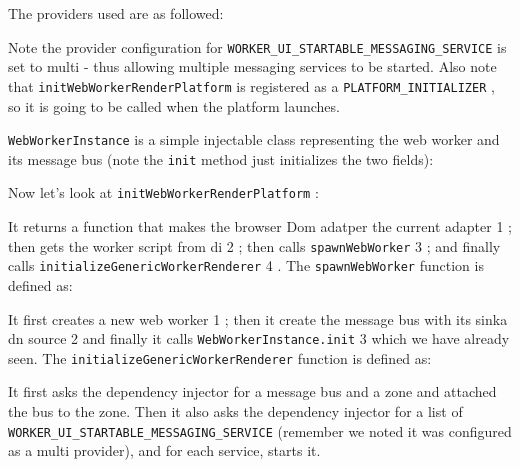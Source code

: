 

The providers used are as followed:



Note the provider configuration for
\texttt{WORKER\_UI\_STARTABLE\_MESSAGING\_SERVICE}
is set
to multi - thus allowing multiple messaging services to be started. Also note that
\texttt{initWebWorkerRenderPlatform}
is registered as a
\texttt{PLATFORM\_INITIALIZER}
, so it is
going to be called when the platform launches.

\texttt{WebWorkerInstance}
is a simple injectable class representing the web worker and its
message bus (note the
\texttt{init}
method just initializes the two fields):



Now let’s look at
\texttt{initWebWorkerRenderPlatform}
:



It returns a function that makes the browser Dom adatper the current adapter
1
; then
gets the worker script from di
2
; then calls
\texttt{spawnWebWorker}
3
; and finally calls
\texttt{initializeGenericWorkerRenderer}
4
. The
\texttt{spawnWebWorker}
function is defined as:



It first creates a new web worker
1
; then it create the message bus with its sinka dn
source
2
and finally it calls
\texttt{WebWorkerInstance.init}
3
which we have already seen.
The
\texttt{initializeGenericWorkerRenderer}
function is defined as:



It first asks the dependency injector for a message bus and a zone and attached the
bus to the zone. Then it also asks the dependency injector for a list of
\texttt{WORKER\_UI\_STARTABLE\_MESSAGING\_SERVICE}
(remember we noted it was configured as
a multi provider), and for each service, starts it.
